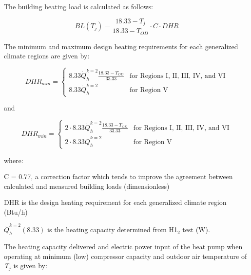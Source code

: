 The building heating load is calculated as follows:

\begin{equation}
BL\left( {{T_j}} \right){\mathrm{ = }}\frac{{{\mathrm{18}}{\mathrm{.33 - }}{T_j}}}{{{\mathrm{18}}{\mathrm{.33 - }}{T_{OD}}}} \cdot C \cdot DHR
\end{equation}

The minimum and maximum design heating requirements for each generalized climate regions are given by:

\begin{equation}
DHR_{min} = \left\{  \begin{array}{cl}
                         8.33 \dot{Q}_h^{k = 2} \frac{18.33-T_{OD}}{33.33} & \text{for Regions I, II, III, IV, and VI} \\
                         8.33 \dot{Q}_h^{k = 2} & \text{for Region V}
                     \end{array}
            \right.
\end{equation}

and

\begin{equation}
DHR_{min} = \left\{  \begin{array}{cl}
                         2 \cdot 8.33 \dot{Q}_h^{k = 2} \frac{18.33-T_{OD}}{33.33} & \text{for Regions I, II, III, IV, and VI} \\
                         2 \cdot 8.33 \dot{Q}_h^{k = 2} & \text{for Region V}
                     \end{array}
            \right.
\end{equation}

where:

C = 0.77, a correction factor which tends to improve the agreement between calculated and measured building loads (dimensionless)

DHR is the design heating requirement for each generalized climate region (Btu/h)

\(\dot Q_h^{k = 2}(8.33)\) is the heating capacity determined from H1\(_{2}\) test (W).

The heating capacity delivered and electric power input of the heat pump when operating at minimum (low) compressor capacity and outdoor air temperature of \emph{T\(_{j}\)} is given by:

